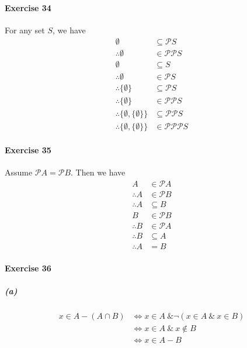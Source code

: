 \documentclass{report}
\begin{document}
    \paragraph{Exercise 34}
    For any set $S$, we have
    \begin{align*}
        \emptyset & \subseteq \mathcal{P} S \\
        \therefore \emptyset & \in \mathcal{PP} S \\
        \emptyset & \subseteq S \\
        \therefore \emptyset & \in \mathcal{P} S \\
        \therefore \{ \emptyset \} & \subseteq \mathcal{P} S \\
        \therefore \{ \emptyset \} & \in \mathcal{PP} S \\
        \therefore \{ \emptyset, \{ \emptyset \} \} & \subseteq \mathcal{PP} S \\
        \therefore \{ \emptyset, \{ \emptyset \} \} & \in \mathcal{PPP} S
    \end{align*}

    \paragraph{Exercise 35}
    Assume $\mathcal{P}A = \mathcal{P} B$. Then we have
    \begin{align*}
        A & \in \mathcal{P} A \\
        \therefore A & \in \mathcal{P} B \\
        \therefore A & \subseteq B \\
        B & \in \mathcal{P} B \\
        \therefore B & \in \mathcal{P} A \\
        \therefore B & \subseteq A \\
        \therefore A & = B
    \end{align*}

    \paragraph{Exercise 36}
    \subparagraph{(a)}
    \begin{align*}
        x \in A - (A \cap B) & \Leftrightarrow x \in A \ \& \neg (x \in A \ \& \ x \in B) \\
        & \Leftrightarrow x \in A\ \& \ x \notin B \\
        & \Leftrightarrow x \in A - B
    \end{align*}
    
\end{document}
